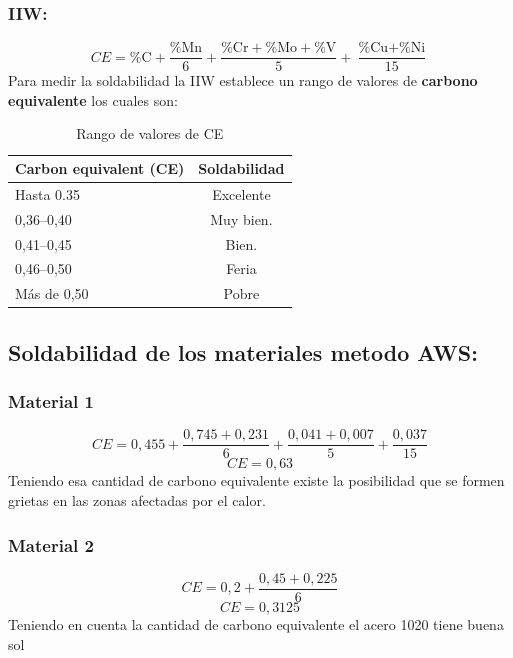 \documentclass[12pt,a4paper]{article}
\begin{document}
\subsubsection{IIW:}
\begin{equation*}
    CE = \text{\%C} + \frac{\text{\%Mn}}{6} + \frac{\text{\%Cr}+\text{\%Mo}+\text{\%V}}{5} + \frac{\text{\%Cu}+\text{\%Ni}}{15}
\end{equation*}
Para medir la soldabilidad la IIW establece un rango de valores de \textbf{carbono equivalente} los cuales son:

\begin{table}[h]
    \centering
    \caption{Rango de valores de CE}
    \begin{tabular}{l|c}
        \hline
        \textbf{Carbon equivalent (CE)} & \textbf{Soldabilidad} \\ \hline
        Hasta 0.35 & Excelente \\ \hline
        0,36--0,40 & Muy bien. \\ \hline
        0,41--0,45 & Bien. \\ \hline
        0,46--0,50 & Feria \\ \hline
        Más de 0,50 & Pobre \\ \hline
    \end{tabular}
\end{table}


\subsection{Soldabilidad de los materiales metodo AWS:}
\subsubsection{Material 1}
\begin{equation*}
    CE = 0,455 + \frac{0,745 + 0,231}{6} + \frac{0,041 + 0,007}{5} + \frac{0,037}{15}
\end{equation*}
\begin{equation*}
    CE = 0,63
\end{equation*}
Teniendo esa cantidad de carbono equivalente existe la posibilidad que se formen grietas en las zonas afectadas por el calor.

\subsubsection{Material 2}
\begin{equation*}
    CE = 0,2 + \frac{0,45 + 0,225}{6} 
\end{equation*}
\begin{equation*}
    CE = 0,3125
\end{equation*}
Teniendo en cuenta la cantidad de carbono equivalente el acero 1020 tiene buena sol
\end{document}
